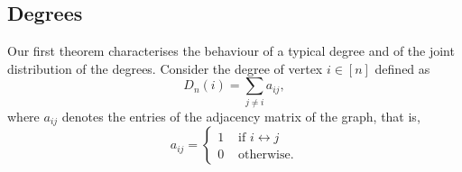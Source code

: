\documentclass[11pt, reqno]{amsart}
\numberwithin{equation}{section}
\theoremstyle{plain} %
\theoremstyle{definition} %
\newtheorem{definition}[theorem]{Definition}
\begin{document}


%
%
%

\subsection{Degrees}

Our first theorem characterises the behaviour of a typical degree and of the joint distribution of the degrees.  Consider the degree of vertex $i\in [n]$ defined as 
\begin{equation} \label{Def D}
    D_n(i) = \sum_{j\neq i} a_{ij},
\end{equation} 
where $a_{ij}$ denotes the entries of the adjacency matrix of the graph, that is,
$$a_{ij}= \begin{cases} 1 & \text{ if $i\leftrightarrow j$}\\
 0 & \text{ otherwise}.
 \end{cases}$$
\end{document}
